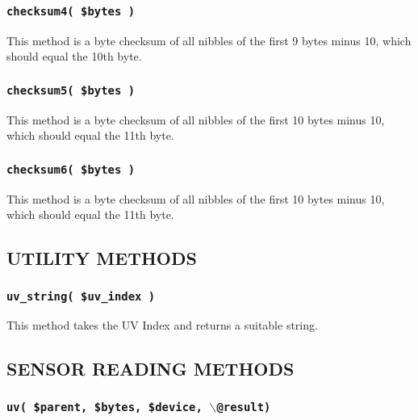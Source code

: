 \subsubsection*{\texttt{checksum4( \$bytes )}\label{xPL::RF::Oregon_checksum4_bytes_}}


This method is a byte checksum of all nibbles of the first 9 bytes
minus 10, which should equal the 10th byte.

\subsubsection*{\texttt{checksum5( \$bytes )}\label{xPL::RF::Oregon_checksum5_bytes_}}


This method is a byte checksum of all nibbles of the first 10 bytes
minus 10, which should equal the 11th byte.

\subsubsection*{\texttt{checksum6( \$bytes )}\label{xPL::RF::Oregon_checksum6_bytes_}}


This method is a byte checksum of all nibbles of the first 10 bytes
minus 10, which should equal the 11th byte.

\subsection*{UTILITY METHODS\label{xPL::RF::Oregon_UTILITY_METHODS}}
\subsubsection*{\texttt{uv\_string( \$uv\_index )}\label{xPL::RF::Oregon_uv_string_uv_index_}}


This method takes the UV Index and returns a suitable string.

\subsection*{SENSOR READING METHODS\label{xPL::RF::Oregon_SENSOR_READING_METHODS}}
\subsubsection*{\texttt{uv( \$parent, \$bytes, \$device, $\backslash$@result)}\label{xPL::RF::Oregon_uv_parent_bytes_device_backslash_result_}}


